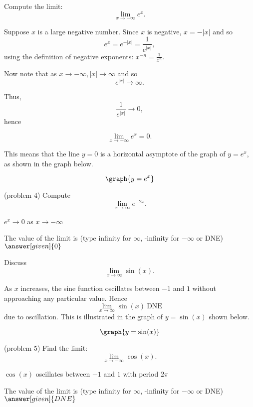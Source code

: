 \documentclass{ximera}
\begin{document}
\begin{example}[example 4]

Compute the limit: 
\[
\lim_{x\to -\infty} e^x.
\]

Suppose $x$ is a large negative number.  Since $x$ is negative, $x = -|x|$ and so
\[
e^x = e^{-|x|} = \frac{1}{e^{|x|}},
\]
using the definition of negative exponents: $x^{-n} = \frac{1}{x^n}$.

Now note that as $x\to -\infty, |x| \to \infty$ and so 
\[
e^{|x|} \to \infty.
\]

Thus, 
\[
\frac{1}{e^{|x|}} \to 0,
\]
hence

\[
\lim_{x\to -\infty} e^x = 0.
\]

This means that the line $y=0$ is a horizontal asymptote of the graph of $y = e^x$,
as shown in the graph below.

\[
\graph{y=e^x}
\]

\end{example}

\begin{problem}(problem 4)
Compute 
\[ \lim_{x \to \infty} e^{-2x}.\]

\begin{hint}
$e^x \to 0$ as $x \to -\infty$
\end{hint}

The value of the limit is
		(type infinity for $\infty$, -infinity for $-\infty$ or DNE)
		 $\answer[given]{0}$
\end{problem}


\begin{example}[example 5]
Discuss
\[
\lim_{x\to \infty} \sin(x).
\]

As $x$ increases, the sine function oscillates between $-1$ and $1$ without approaching any particular value.
Hence
\[
\lim_{x\to \infty} \sin(x) \ \text{DNE}
\]
due to oscillation.
This is illustrated in the graph of $y=\sin(x)$ shown below.

\[
\graph{y=\sin(x)}
\]

\end{example}

\begin{problem}(problem 5)
Find the limit:
\[
 \lim_{x \to -\infty} \cos(x).
\]

\begin{hint}
$\cos(x)$ oscillates between $-1$ and $1$ with period $2\pi$
\end{hint}

The value of the limit is
		(type infinity for $\infty$, -infinity for $-\infty$ or DNE)
		 $\answer[given]{DNE}$
\end{problem}

\begin{center}
\begin{foldable}
\end{foldable}
\end{center}
\end{document}
